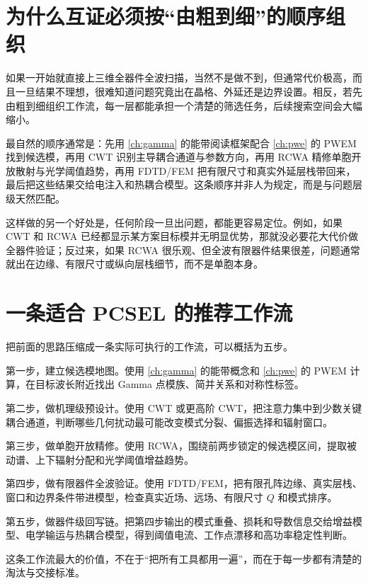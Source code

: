 \section{为什么互证必须按“由粗到细”的顺序组织}
如果一开始就直接上三维全器件全波扫描，当然不是做不到，但通常代价极高，而且一旦结果不理想，很难知道问题究竟出在晶格、外延还是边界设置。相反，若先由粗到细组织工作流，每一层都能承担一个清楚的筛选任务，后续搜索空间会大幅缩小。

最自然的顺序通常是：先用 \cref{ch:gamma} 的能带阅读框架配合 \cref{ch:pwe} 的 PWEM 找到候选模，再用 CWT 识别主导耦合通道与参数方向，再用 RCWA 精修单胞开放散射与光学阈值趋势，再用 FDTD/FEM 把有限尺寸和真实外延层栈带回来，最后把这些结果交给电注入和热耦合模型。这条顺序并非人为规定，而是与问题层级天然匹配。

这样做的另一个好处是，任何阶段一旦出问题，都能更容易定位。例如，如果 CWT 和 RCWA 已经都显示某方案目标模并无明显优势，那就没必要花大代价做全器件验证；反过来，如果 RCWA 很乐观、但全波有限器件结果很差，问题通常就出在边缘、有限尺寸或纵向层栈细节，而不是单胞本身。

\section{一条适合 PCSEL 的推荐工作流}
把前面的思路压缩成一条实际可执行的工作流，可以概括为五步。

第一步，建立候选模地图。使用 \cref{ch:gamma} 的能带概念和 \cref{ch:pwe} 的 PWEM 计算，在目标波长附近找出 Gamma 点模族、简并关系和对称性标签。

第二步，做机理级预设计。使用 CWT 或更高阶 CWT，把注意力集中到少数关键耦合通道，判断哪些几何扰动最可能改变模式分裂、偏振选择和辐射窗口。

第三步，做单胞开放精修。使用 RCWA，围绕前两步锁定的候选模区间，提取被动谱、上下辐射分配和光学阈值增益趋势。

第四步，做有限器件全波验证。使用 FDTD/FEM，把有限孔阵边缘、真实层栈、窗口和边界条件带进模型，检查真实近场、远场、有限尺寸 $Q$ 和模式排序。

第五步，做器件级回写链。把第四步输出的模式重叠、损耗和导数信息交给增益模型、电学输运与热耦合模型，得到阈值电流、工作点漂移和高功率稳定性判断。

这条工作流最大的价值，不在于“把所有工具都用一遍”，而在于每一步都有清楚的淘汰与交接标准。

